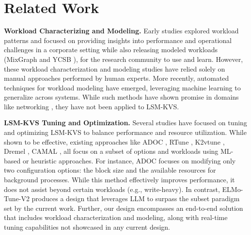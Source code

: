 \section{Related Work}
\vspace{0.3em}
\noindent\textbf{Workload Characterizing and Modeling.}
Early studies \cite{cao2020characterizing, dong2017optimizing, ycsb} explored workload patterns and focused on providing insights into performance and operational challenges in a corporate setting while also releasing modeled workloads (MixGraph \cite{cao2020characterizing} and YCSB \cite{ycsb}), for the research community to use and learn. However, these workload characterization and modeling studies have relied solely on manual approaches performed by human experts.  
More recently, automated techniques for workload modeling have emerged, leveraging machine learning to generalize across systems. While such methods have shown promise in domains like networking \cite{gan_modeling_network}, they have not been applied to LSM-KVS. 

\vspace{0.3em}
\noindent\textbf{LSM-KVS Tuning and Optimization.}
Several studies have focused on tuning and optimizing LSM-KVS to balance performance and resource utilization. While shown to be effective, existing approaches like ADOC \cite{yu2023adoc}, RTune \cite{RTune}, K2vtune \cite{lee2024k2vtune}, Dremel \cite{Dremel}, CAMAL \cite{yu2024camal}, all focus on a subset of options and workloads using ML-based or heuristic approaches. For instance, ADOC focuses on modifying only two configuration options: the block size and the available resources for background processes. While this method effectively improves performance, it does not assist beyond certain workloads (e.g., write-heavy). In contrast, ELMo-Tune-V2 produces a design that leverages LLM to surpass the subset paradigm set by the current work. Further, our design encompasses an end-to-end solution that includes workload characterization and modeling, along with real-time tuning capabilities not showcased in any current design. 

